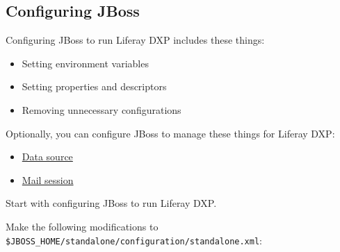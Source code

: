 \noindent\hrulefill

\subsection{Configuring JBoss}\label{configuring-jboss}

Configuring JBoss to run Liferay DXP includes these things:

\begin{itemize}
\tightlist
\item
  Setting environment variables
\item
  Setting properties and descriptors
\item
  Removing unnecessary configurations
\end{itemize}

Optionally, you can configure JBoss to manage these things for Liferay
DXP:

\begin{itemize}
\tightlist
\item
  \hyperref[database-configuration]{Data source}
\item
  \hyperref[mail-configuration]{Mail session}
\end{itemize}

Start with configuring JBoss to run Liferay DXP.

Make the following modifications to
\texttt{\$JBOSS\_HOME/standalone/configuration/standalone.xml}:


